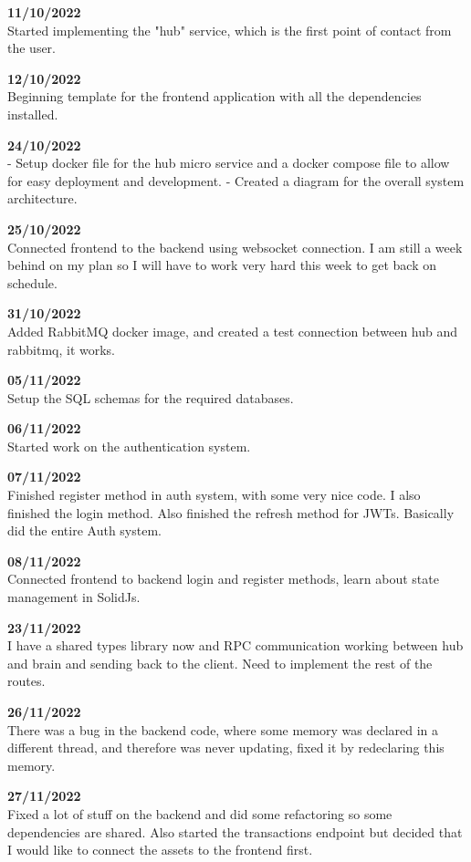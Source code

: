 \documentclass[titlepage]{article}
\begin{document}
\textbf{11/10/2022} \\
Started implementing the "hub" service, which is the first point of contact from the user.

\textbf{12/10/2022} \\
Beginning template for the frontend application with all the dependencies installed.

\textbf{24/10/2022} \\
- Setup docker file for the hub micro service and a docker compose file to allow for easy deployment and development.
- Created a diagram for the overall system architecture.

\textbf{25/10/2022} \\
Connected frontend to the backend using websocket connection. I am still a week behind on my plan so I will have to work very hard this week to get back on schedule.

\textbf{31/10/2022} \\
Added RabbitMQ docker image, and created a test connection between hub and rabbitmq, it works.

\textbf{05/11/2022} \\
Setup the SQL schemas for the required databases.

\textbf{06/11/2022} \\
Started work on the authentication system.

\textbf{07/11/2022} \\
Finished register method in auth system, with some very nice code.
I also finished the login method.
Also finished the refresh method for JWTs. Basically did the entire Auth system.

\textbf{08/11/2022} \\
Connected frontend to backend login and register methods, learn about state management in SolidJs.

\textbf{23/11/2022} \\
I have a shared types library now and RPC communication working between hub and brain and sending back to the client. Need to implement the rest of the routes.

\textbf{26/11/2022} \\
There was a bug in the backend code, where some memory was declared in a different thread, and therefore was never updating, fixed it by redeclaring this memory.

\textbf{27/11/2022} \\
Fixed a lot of stuff on the backend and did some refactoring so some dependencies are shared. Also started the transactions endpoint but decided that I would like to connect the assets to the frontend first.
\end{document}

